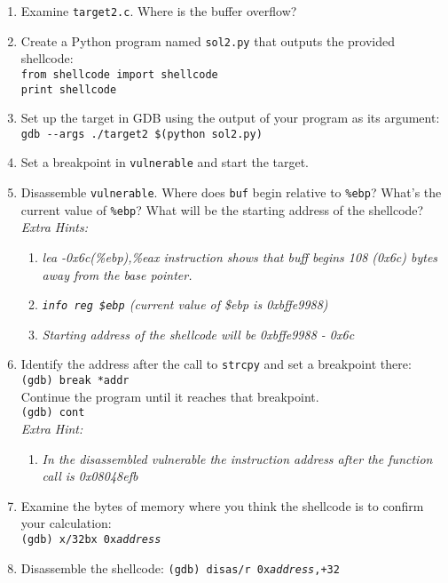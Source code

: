 \documentclass[letterpaper,12pt]{report}
\begin{document}
{\begin{enumerate}
\item Examine \texttt{target2.c}.  Where is the buffer overflow?
\item Create a Python program named \texttt{sol2.py} that outputs the provided shellcode:\\
\texttt{from shellcode import shellcode}\\
\texttt{print shellcode}
\item Set up the target in GDB using the output of your program as its argument:\\
\texttt{gdb -{}-args ./target2 \$(python sol2.py)}
\item Set a breakpoint in \texttt{vulnerable} and start the target.
\item Disassemble \texttt{vulnerable}.  Where does \texttt{buf} begin relative
to \texttt{\%ebp}?  What's the current value of \texttt{\%ebp}?  What will be
the starting address of the shellcode?  \\
\textit{Extra Hints:}
\vspace{-11pt}
\begin{enumerate}
\item \textit{lea  -0x6c(\%ebp),\%eax instruction shows that buff begins 108 (0x6c) bytes away from the base pointer.}
\item \textit{\texttt{info reg \$ebp} (current value of \$ebp is 0xbffe9988)}
\item \textit{Starting address of the shellcode will be 0xbffe9988 - 0x6c}
\end{enumerate}
\item Identify the address after the call to \texttt{strcpy} and set a breakpoint there:\\
\texttt{(gdb) break *addr}\\
Continue the program until it reaches that breakpoint.\\
\texttt{(gdb) cont} \\
\textit{Extra Hint:}
\vspace{-11pt}
\begin{enumerate}
\item \textit{In the disassembled vulnerable the instruction address after the function call is 0x08048efb}
\end{enumerate}
\item Examine the bytes of memory where you think the shellcode is to confirm your calculation:\\
\texttt{(gdb) x/32bx 0x\emph{address}}
\item Disassemble the shellcode:  \texttt{(gdb) disas/r 0x\emph{address},+32}\\

\end{enumerate}}
\end{document}
